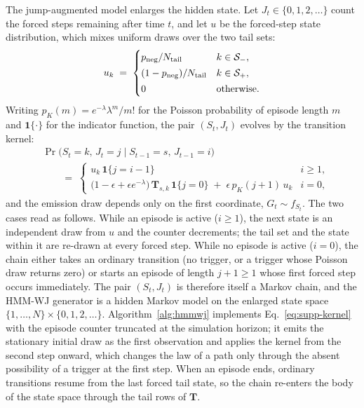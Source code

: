The jump-augmented model enlarges the hidden state. Let
$J_t \in \{0, 1, 2, \dots\}$ count the forced steps remaining after
time $t$, and let $u$ be the forced-step state distribution, which
mixes uniform draws over the two tail sets:
\begin{equation}
  u_k \;=\;
  \begin{cases}
    p_{\rm neg}/N_{\rm tail} & k \in \mathcal{S}_{-},\\[2pt]
    (1 - p_{\rm neg})/N_{\rm tail} & k \in \mathcal{S}_{+},\\[2pt]
    0 & \text{otherwise}.
  \end{cases}
  \label{eq:supp-u}
\end{equation}
Writing $p_K(m) = e^{-\lambda} \lambda^m / m!$ for the Poisson
probability of episode length $m$ and $\mathbf{1}\{\cdot\}$ for the
indicator function, the pair $(S_t, J_t)$ evolves by the transition
kernel:
\begin{equation}
\begin{aligned}
  &\Pr\big(S_t = k,\, J_t = j \mid S_{t-1} = s,\, J_{t-1} = i\big) \\
  &\qquad=\;
  \begin{cases}
    u_k\, \mathbf{1}\{j = i - 1\} & i \ge 1,\\[6pt]
    \big(1 - \epsilon + \epsilon e^{-\lambda}\big)\,
      \mathbf{T}_{s, k}\, \mathbf{1}\{j = 0\}
      \;+\; \epsilon\, p_K(j + 1)\, u_k & i = 0,
  \end{cases}
\end{aligned}
  \label{eq:supp-kernel}
\end{equation}
and the emission draw depends only on the first coordinate,
$G_t \sim f_{S_t}$. The two cases read as follows. While an episode is
active ($i \ge 1$), the next state is an independent draw from $u$ and
the counter decrements; the tail set and the state within it are
re-drawn at every forced step. While no episode is active ($i = 0$),
the chain either takes an ordinary transition (no trigger, or a
trigger whose Poisson draw returns zero) or starts an episode of
length $j + 1 \ge 1$ whose first forced step occurs immediately. The
pair $(S_t, J_t)$ is therefore itself a Markov chain, and the HMM-WJ
generator is a hidden Markov model on the enlarged state space
$\{1, \dots, N\} \times \{0, 1, 2, \dots\}$. Algorithm~\ref{alg:hmmwj}
implements Eq.~\eqref{eq:supp-kernel} with the episode
counter truncated at the simulation horizon; it emits
the stationary initial draw as the first observation and applies the
kernel from the second step onward, which changes the law of a path
only through the absent possibility of a trigger at the first step.
When an episode ends,
ordinary transitions resume from the last forced tail state, so the
chain re-enters the body of the state space through the tail rows of
$\mathbf{T}$.

